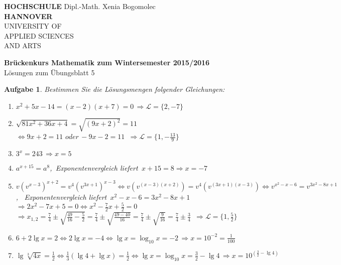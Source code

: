 \documentclass[12pt]{article}
\newtheorem{exercise}[satz]{Aufgabe}
\begin{document}
   \pagestyle{empty}
   \parindent 0cm
   \begin{minipage}{14cm}
   \footnotesize{\textbf{HOCHSCHULE} \hfill Dipl.-Math. Xenia Bogomolec\\
  \textbf{HANNOVER}\\
   UNIVERSITY OF\\
   APPLIED SCIENCES\\
   AND ARTS
   }
   \end{minipage}
   \vspace{1.0cm}

   \begin{center}
     {\Large \bf Br\"uckenkurs Mathematik zum Wintersemester 2015/2016} \\
     \vspace{0.5cm}
     {\large L\"osungen zum \"Ubungsblatt 5}  \\

  \end{center}
   \vspace{0.5cm}
   \normalsize
   \parindent0cm
   
  \begin{exercise}
  Bestimmen Sie die L\"osungsmengen folgender Gleichungen:
  \begin{enumerate}
  \item[(a)] $x^2+5x-14=(x-2)(x+7)=0 \,\Rightarrow \mathcal{L} = \{2,-7\}$
  \item[(b)] $\sqrt{81x^2+36x+4}=\sqrt{(9x+2)^2}=11 $\\
             $\Leftrightarrow 9x+2=11 \,\, oder \,-9x-2=11$
             $\,\Rightarrow \mathcal{L} = \{1,-\frac{13}{9}\}$
  \item[(c)] $3^x = 243 \,\Rightarrow x=5$
  \item[(d)] $a^{x+15}=a^8$, \,Exponentenvergleich liefert\, $x+15=8\Rightarrow x=-7$
  \item[(e)] $v(v^{x-3})^{x+2} = v^4(v^{3x+1})^{x-3}\Leftrightarrow
             v(v^{(x-3)(x+2)}) = v^4(v^{(3x+1)(x-3)})\Leftrightarrow
             v^{x^2-x-6}=v^{3x^2-8x+1}$,
            \, Exponentenvergleich liefert\, $x^2-x-6=3x^2-8x+1$ \\
             $\Rightarrow 2x^2-7x+5=0 \Leftrightarrow x^2-\frac{7}{2}x+\frac{5}{2}=0$\\
             $\Rightarrow x_{1,2}=\frac{7}{4}\pm\sqrt{\frac{49}{16}-\frac{5}{2}}=\frac{7}{4}\pm\sqrt{\frac{49-40}{16}}=\frac{7}{4}\pm\sqrt{\frac{9}{16}}=\frac{7}{4}\pm\frac{3}{4}$
             $\,\Rightarrow \mathcal{L} = \{1,\frac{5}{2}\}$
  \item[(f)] $6 + 2\lg{x} = 2 \Leftrightarrow 2\lg{x} = -4 \Leftrightarrow 
            \lg{x}=\log_{10}x = -2 \,\Rightarrow x=10^{-2}=\frac{1}{100}$\\
  \item[(g)] $\lg{\sqrt[3]{4x}} = \frac{1}{2}\Leftrightarrow \frac{1}{3}(\lg{4}+\lg{x})=\frac{1}{2}\Leftrightarrow \lg{x}=\log_{10}x=\frac{3}{2}-\lg{4}\,\Rightarrow x=10^{(\frac{3}{2}-\lg{4})}$
  \end{enumerate}
   \end{exercise}
\end{document}
